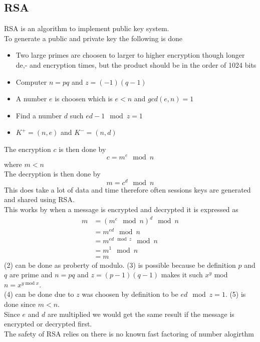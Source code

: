\documentclass[12pt, a4paper]{article}
\begin{document}
		\subsection{RSA}
			RSA is an algorithm to implement public key system.\\
			To generate a public and private key the following is done
			\begin{itemize}
				\item Two large primes are choosen to larger to higher encryption though longer de,- and encryption times, but the product should be in the order of 1024 bits
				\item Computer $n=pq$ and $z=(-1)(q-1)$
				\item A number $e$ is choosen which is $e<n$ and $gcd(e,n)=1$
				\item Find a number $d$ such $ed-1 \mod z=1$ 
				\item $K^+=(n,e)$ and $K^-=(n,d)$
			\end{itemize}
			The encryption $c$ is then done by
			$$c=m^e\mod n$$ where $m<n$\\
			The decryption is then done by
			$$m=c^d\mod n$$
			This does take a lot of data and time therefore often sessions keys are generated and shared using RSA.\\
			This works by when a message is encrypted and decrypted it is expressed as
			\begin{align}
				m&=(m^e\mod n)^d\mod n\\
				&=m^{ed}\mod n\\
				&=m^{ed\mod z}\mod n\\
				&=m^1\mod n\\
				&=m
			\end{align}
			(2) can be done as proberty of modulo. (3) is possible because be definition $p$ and $q$ are prime and $n=pq$ and $z=(p-1)(q-1)$ makes it such $x^y$ mod $n=x^{y\;\text{mod}\;x}$.\\
			(4) can be done due to $z$ was choosen by definition to be $ed\mod z = 1$. (5) is done since $m<n$.\\
			Since $e$ and $d$ are multiplied we would get the same result if the message is encrypted or decrypted first.\\[4mm]
			The safety of RSA relies on there is no known fast factoring of number alogirthm
			
\end{document}
